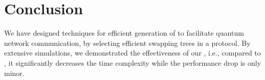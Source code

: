 \section{Conclusion}
\label{sec:swapping_conc}

We have designed techniques for efficient generation of \eps to facilitate quantum
network communication, by selecting efficient swapping trees in a \wt protocol.
By extensive simulations, we demonstrated the effectiveness of our \dpalt, i.e., compared to \dpa, it significantly decreases the time complexity
while the performance drop is only minor.

